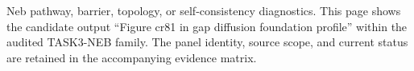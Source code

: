 Neb pathway, barrier, topology, or self-consistency diagnostics. This page shows the candidate output ``Figure cr81 in gap diffusion foundation profile'' within the audited TASK3-NEB family. The panel identity, source scope, and current status are retained in the accompanying evidence matrix.
